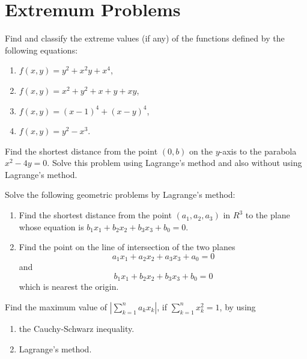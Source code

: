 \section{Extremum Problems}
\begin{problembox}
Find and classify the extreme values (if any) of the functions defined by the following equations:
\begin{enumerate}[label=(\alph*)]
    \item \( f(x, y) = y^2 + x^2y + x^4 \),
    \item \( f(x, y) = x^2 + y^2 + x + y + xy \),
    \item \( f(x, y) = (x - 1)^4 + (x - y)^4 \),
    \item \( f(x, y) = y^2 - x^3 \).
\end{enumerate}
\end{problembox}

\begin{problembox}
Find the shortest distance from the point \((0, b)\) on the \( y \)-axis to the parabola \( x^2 - 4y = 0 \). Solve this problem using Lagrange's method and also without using Lagrange's method.
\end{problembox}

\begin{problembox}
Solve the following geometric problems by Lagrange's method:
\begin{enumerate}[label=(\alph*)]
    \item Find the shortest distance from the point \((a_1, a_2, a_3)\) in \( R^3 \) to the plane whose equation is \( b_1x_1 + b_2x_2 + b_3x_3 + b_0 = 0 \).
    \item Find the point on the line of intersection of the two planes
    \[a_1x_1 + a_2x_2 + a_3x_3 + a_0 = 0\]
    and
    \[b_1x_1 + b_2x_2 + b_3x_3 + b_0 = 0\]
    which is nearest the origin.
\end{enumerate}
\end{problembox}

\begin{problembox}
Find the maximum value of \(| \sum_{k=1}^n a_k x_k |\), if \(\sum_{k=1}^n x_k^2 = 1\), by using 
\begin{enumerate}[label=(\alph*)]
    \item the Cauchy-Schwarz inequality.
    \item Lagrange's method.
\end{enumerate}
\end{problembox}


